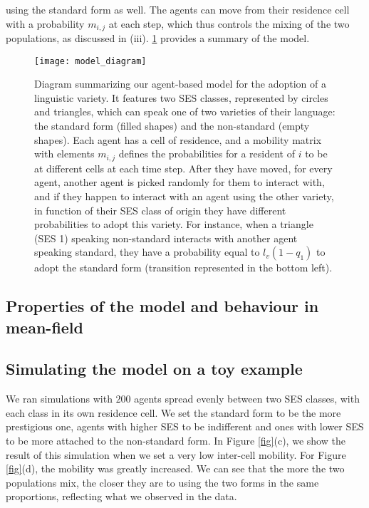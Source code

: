 \documentclass[../thesis.tex]{subfiles}
\begin{document}
using the standard form as well. The agents can move from their residence cell with a
probability $m_{i,j}$ at each step, which thus controls the mixing of the two
populations, as discussed in (iii). \cref{fig:model_diagram} provides a summary of the
model.
\begin{figure}
\centering
  \texttt{[image: model\_diagram]}
  \caption{Diagram summarizing our agent-based model for the adoption of a linguistic
  variety. It features two \ac{SES} classes, represented by circles and triangles, which
  can speak one of two varieties of their language: the standard form (filled shapes)
  and the non-standard (empty shapes). Each agent has a cell of residence, and a
  mobility matrix with elements $m_{i, j}$ defines the probabilities for a resident of
  $i$ to be at different cells at each time step. After they have moved, for every
  agent, another agent is picked randomly for them to interact with, and if they happen
  to interact with an agent using the other variety, in function of their \ac{SES} class
  of origin they have different probabilities to adopt this variety. For instance, when
  a triangle (\ac{SES} 1) speaking non-standard interacts with another agent speaking
  standard, they have a probability equal to $l_v (1 - q_1)$ to adopt the standard form
  (transition represented in the bottom left).}
  \label{fig:model_diagram}
\end{figure}




\subsection{Properties of the model and behaviour in mean-field}


\subsection{Simulating the model on a toy example}
We ran simulations with $200$ agents spread evenly between two SES classes, with each
class in its own residence cell. We set the standard form to be the more prestigious
one, agents with higher SES to be indifferent and ones with lower SES to be more
attached to the non-standard form. In Figure \cref{fig}(c), we show the result of this
simulation when we set a very low inter-cell mobility. For Figure \cref{fig}(d), the
mobility was greatly increased. We can see that the more the two populations mix, the
closer they are to using the two forms in the same proportions, reflecting what we
observed in the data.
\end{document}
